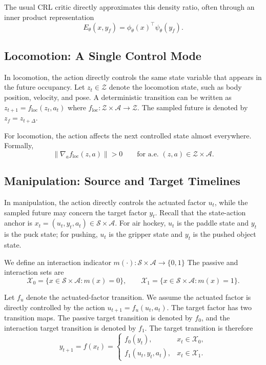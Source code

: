 The usual CRL critic directly approximates this density ratio, often through an inner product representation
\begin{equation}
E_\theta(x,y_f)
=
\phi_\theta(x)^\top\psi_\theta(y_f).
\end{equation}

\subsection{Locomotion: A Single Control Mode}

In locomotion, the action directly controls the same state variable that appears in the future occupancy. Let \(z_t\in\mathcal Z\) denote the locomotion state, such as body position, velocity, and pose. A deterministic transition can be written as $z_{t+1}=f_{\mathrm{loc}}(z_t,a_t)$
where \(f_{\mathrm{loc}}:\mathcal Z\times\mathcal A\rightarrow\mathcal Z\). The sampled future is denoted by \(z_f=z_{t+\Delta}\).

\begin{assumption}
\label{assump:locomotion_action_effect}
For locomotion, the action affects the next controlled state almost everywhere. Formally,
\begin{equation}
\left\|
\nabla_a f_{\mathrm{loc}}(z,a)
\right\| > 0
\qquad
\text{for } \text{a.e. }(z,a)\in\mathcal Z\times\mathcal A.
\end{equation}
\end{assumption}


\subsection{Manipulation: Source and Target Timelines}

In manipulation, the action directly controls the actuated factor \(u_t\), while the sampled future may concern the target factor \(y_t\). Recall that the state-action anchor is \(x_t=(u_t,y_t,a_t)\in\mathcal S\times\mathcal A\). For air hockey, \(u_t\) is the paddle state and \(y_t\) is the puck state; for pushing, \(u_t\) is the gripper state and \(y_t\) is the pushed object state.

We define an interaction indicator $m(\cdot):\mathcal S\times\mathcal A\rightarrow\{0,1\}$ The passive and interaction sets are
\[
\mathcal X_0=\{x\in\mathcal S\times\mathcal A:m(x)=0\},
\qquad
\mathcal X_1=\{x\in\mathcal S\times\mathcal A:m(x)=1\}.
\]

Let \(f_u\) denote the actuated-factor transition. We assume the actuated factor is directly controlled by the action $u_{t+1}=f_u(u_t,a_t)$. The target factor has two transition maps. The passive target transition is denoted by \(f_0\), and the interaction target transition is denoted by \(f_1\). The target transition is therefore
\begin{equation}
y_{t+1}
=
f(x_t)
=
\begin{cases}
f_0(y_t), & x_t\in\mathcal X_0,\\
f_1(u_t,y_t,a_t), & x_t\in\mathcal X_1.
\end{cases}
\end{equation}

